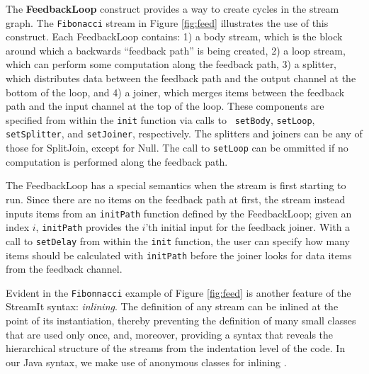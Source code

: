 The {\bf FeedbackLoop} construct provides a way to create cycles in the
stream graph.  The {\tt Fibonacci} stream in Figure \ref{fig:feed}
illustrates the use of this construct.  Each FeedbackLoop contains: 1) a
body stream, which is the block around which a backwards ``feedback
path'' is being created, 2) a loop stream, which can perform some
computation along the feedback path, 3) a splitter, which distributes
data between the feedback path and the output channel at the bottom of
the loop, and 4) a joiner, which merges items between the feedback path
and the input channel at the top of the loop.  These components are
specified from within the {\tt init} function via calls to {\tt
setBody}, {\tt setLoop}, {\tt setSplitter}, and {\tt setJoiner},
respectively.
%
%
The splitters and joiners can be any of those for SplitJoin, except for
Null.  The call to {\tt setLoop} can be ommitted if no computation is
performed along the feedback path.

The FeedbackLoop has a special semantics when the stream is first
starting to run.  Since there are no items on the feedback path at
first, the stream instead inputs items from an {\tt initPath} function
defined by the FeedbackLoop; given an index $i$, {\tt initPath}
provides the $i$'th initial input for the feedback joiner.  With a
call to {\tt setDelay} from within the {\tt init} function, the user
can specify how many items should be calculated with {\tt initPath}
before the joiner looks for data items from the feedback channel.

Evident in the {\tt Fibonnacci} example of Figure \ref{fig:feed} is
another feature of the StreamIt syntax: {\it inlining}.  The definition
of any stream can be inlined at the point of its instantiation, thereby
preventing the definition of many small classes that are used only once,
and, moreover, providing a syntax that reveals the hierarchical
structure of the streams from the indentation level of the code.  In our
Java syntax, we make use of anonymous classes for inlining \cite{java}.

